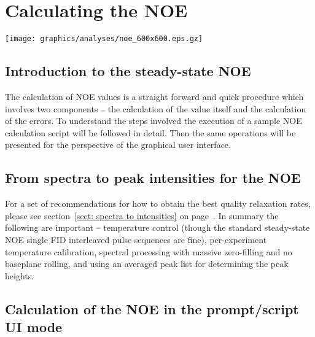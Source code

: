 
\chapter{Calculating the NOE} \label{ch: NOE}


\begin{figure*}[h]
\texttt{[image: graphics/analyses/noe\_600x600.eps.gz]}
\end{figure*}



\section{Introduction to the steady-state NOE}

The calculation of NOE values is a straight forward and quick procedure which involves two components -- the calculation of the value itself and the calculation of the errors.  To understand the steps involved the execution of a sample NOE calculation script will be followed in detail.  Then the same operations will be presented for the perspective of the graphical user interface.




\section{From spectra to peak intensities for the NOE}

For a set of recommendations for how to obtain the best quality relaxation rates, please see section~\ref{sect: spectra to intensities} on page~\pageref{sect: spectra to intensities}.  In summary the following are important -- temperature control (though the standard steady-state NOE single FID interleaved pulse sequences are fine), per-experiment temperature calibration, spectral processing with massive zero-filling and no baseplane rolling, and using an averaged peak list for determining the peak heights.



\section{Calculation of the NOE in the prompt/script UI mode}


